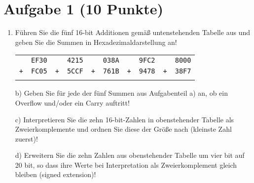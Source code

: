 \section*{Aufgabe 1 (10 Punkte)}

\begin{enumerate}[label={a)}, leftmargin=*]
\item Führen Sie die fünf 16-bit Additionen gemäß untenstehenden Tabelle aus und geben Sie die Summen in Hexadezimaldarstellung an!

\begin{table}[h]
\centering
\begin{tabular}{|cc|cc|cc|cc|cc|}
& \texttt{EF30} & & \texttt{4215} & & \texttt{038A} & & \texttt{9FC2} & & \texttt{8000}\\
\texttt{+} & \texttt{FC05} & \texttt{+} & \texttt{5CCF} & \texttt{+} & \texttt{761B} & \texttt{+} & \texttt{9478} & \texttt{+} & \texttt{38F7}\\
\hline
& & & & & & & & &\\
\end{tabular}
\end{table}

\item[b)] Geben Sie für jede der fünf Summen aus Aufgabenteil a) an, ob ein Overflow und/oder ein Carry auftritt!
\item[c)] Interpretieren Sie die zehn 16-bit-Zahlen in obenstehender Tabelle als Zweierkomplemente und ordnen Sie diese der Größe nach (kleinste Zahl zuerst)!
\item[d)] Erweitern Sie die zehn Zahlen aus obenstehender Tabelle um vier bit auf 20 bit, so dass ihre Werte bei Interpretation als Zweierkomplement gleich bleiben (signed extension)!
\end{enumerate}